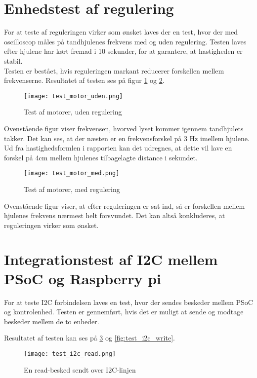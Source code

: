 \section{Enhedstest af regulering}
For at teste af reguleringen virker som ønsket laves der en test, hvor der med oscilloscop måles på tandhjulenes frekvens med og uden regulering. Testen laves efter hjulene har kørt fremad i 10 sekunder, for at garantere, at hastigheden er stabil.
\\Testen er bestået, hvis reguleringen markant reducerer forskellen mellem frekvenserne.
Resultatet af testen ses på figur \ref{fig:test_motor_uden} og \ref{fig:test_motor_med}.
\begin{figure}[H]  %
\centering
\texttt{[image: test\_motor\_uden.png]}
\caption{Test af motorer, uden regulering}
\label{fig:test_motor_uden}
\end{figure}
Ovenstående figur viser frekvensen, hvorved lyset kommer igennem tandhjulets takker. Det kan ses, at der næsten er en frekvensforskel på 3 Hz imellem hjulene. Ud fra hastighedsformlen i rapporten kan det udregnes, at dette vil lave en forskel på 4cm mellem hjulenes tilbagelagte distance i sekundet.
\begin{figure}[H]  %
\centering
\texttt{[image: test\_motor\_med.png]}
\caption{Test af motorer, med regulering}
\label{fig:test_motor_med}
\end{figure}

Ovenstående figur viser, at efter reguleringen er sat ind, så er forskellen mellem hjulenes frekvens nærmest helt forsvundet. Det kan altså konkluderes, at reguleringen virker som ønsket.

\section{Integrationstest af I2C mellem PSoC og Raspberry pi}
For at teste I2C forbindelsen laves en test, hvor der sendes beskeder mellem PSoC og kontrolenhed.
Testen er gennemført, hvis det er muligt at sende og modtage beskeder mellem de to enheder.

Resultatet af testen kan ses på \ref{fig:test_i2c_read} og \ref{fig:test_i2c_write}.

\begin{figure}[H]  %
\centering
\texttt{[image: test\_i2c\_read.png]}
\caption{En read-besked sendt over I2C-linjen}
\label{fig:test_i2c_read}
\end{figure}

